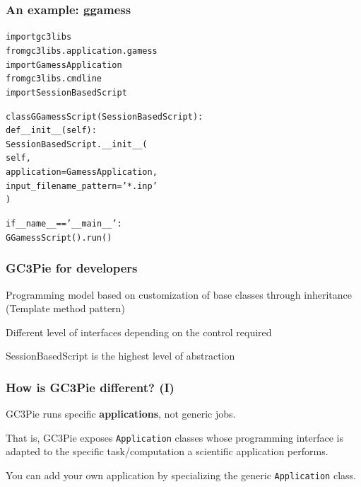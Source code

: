 \documentclass[english,serif,mathserif,xcolor=pdftex,dvipsnames,table]{beamer}
\begin{document}
\begin{frame}[fragile]
  \frametitle{An example: ggamess}
  \begin{alltt}
import gc3libs
from gc3libs.application.gamess 
     {\color{Blue}import} GamessApplication
from gc3libs.cmdline 
     {\color{Blue}import} SessionBasedScript

class {\color{Violet} GGamessScript}({\color{Violet}SessionBasedScript}):
  def \_\_init\_\_(self):
    SessionBasedScript.\_\_init\_\_(
       self,
       application = {\color{Violet}GamessApplication},
       input_filename_pattern = '{\color{Green}*.inp}'
    )
             
if \_\_name\_\_ == '{\color{Green}\_\_main\_\_}':
  GGamessScript().{\color{Blue}run()}
\end{alltt}
\end{frame}



\begin{frame}
  \frametitle{GC3Pie for developers}
    \begin{block}{}
      Programming model based on customization of base classes through
      inheritance ({\color{Blue}Template method} pattern)
    \end{block}
    
    \begin{block}{}
      Different level of {\color{Blue}interfaces} depending on the control required
    \end{block}

    \begin{block}{}
      {\color{Blue}SessionBasedScript} is the highest level of abstraction
    \end{block}
\end{frame}

\begin{frame}
  \frametitle{How is GC3Pie different? (I)}
  
  \begin{block}{}
    GC3Pie runs specific \textbf{applications}, not generic jobs.
  \end{block}
  
   \begin{block}{}
     That is, GC3Pie exposes \texttt{Application} classes whose programming
    interface is adapted to the specific task/computation a scientific
    application performs.
  \end{block}
    
  \begin{block}{}
    You can add your own application by specializing the generic
    \texttt{Application} class.
  \end{block}
\end{frame}
\end{document}

